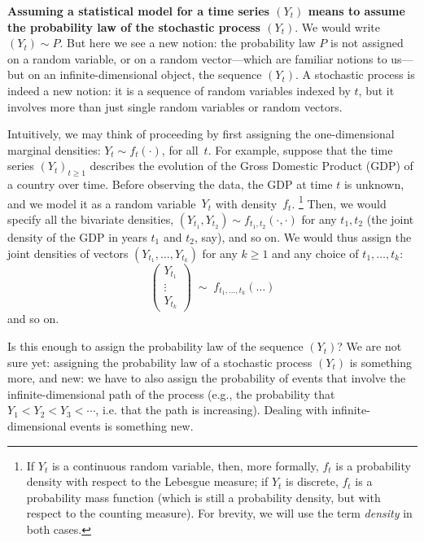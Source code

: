 \documentclass[dvipsnames,12pt]{book}
\begin{document}
                \textbf{Assuming a statistical model for a time series $(Y_t)$ means to assume the probability law of the stochastic process $(Y_t)$}. We would write $(Y_t)\sim P$. But here we see a new notion: the probability law $P$ is not assigned on a random variable,  or on a random vector---which are familiar notions to us---but on an infinite-dimensional object, the sequence $(Y_t)$. A stochastic process is indeed a new notion: it is a sequence of random variables indexed by $t$, but it involves more than just single random variables or random vectors.
                
                Intuitively, we may think of proceeding by first assigning the one-dimensional marginal densities: $Y_t \sim f_t(\cdot)$, for all~$t$. For example, suppose that the time series $(Y_t)_{t\ge 1}$ describes the evolution of the Gross Domestic Product (GDP) of a country over time. Before observing the data, the GDP at time $t$ is unknown, and we model it as a random variable~$Y_t$ with density~$f_t$.%
                \footnote{%
                  If $Y_t$ is a continuous random variable, then, more formally, $f_t$ is a probability density with respect to the Lebesgue measure; if $Y_t$ is discrete, $f_t$ is a probability mass function (which is still a probability density, but with respect to the counting measure). For brevity, we will use the term \emph{density} in both cases.
                }
                Then, we would specify all the bivariate densities, $(Y_{t_1}, Y_{t_2}) \sim f_{t_1,t_2}(\cdot,\cdot)$ for any $t_1, t_2$ (the joint density of the GDP in years $t_1$ and $t_2$, say), and so on. We would thus assign the joint densities of vectors $(Y_{t_1}, \ldots, Y_{t_k})$ for any $k \ge 1$ and any choice of $t_1, \ldots, t_k$:
                \begin{equation}\label{eq:L3-1}
                    \begin{pmatrix}
                    Y_{t_1}\\
                    \vdots\\
                    Y_{t_k}
                    \end{pmatrix}
                    \;\sim\; f_{t_1,\ldots,t_k}(\dots)
                \end{equation}
                and so on.
                
                Is this enough to assign the probability law of the sequence $(Y_t)$? We are not sure yet: assigning the probability law of a stochastic process $(Y_t)$ is something more, and new: we have to also assign the probability of events that involve the infinite-dimensional path of the process (e.g., the probability that $Y_1 < Y_2 < Y_3 < \cdots$, i.e. that the path is increasing). Dealing with infinite-dimensional events is something new.
\end{document}
